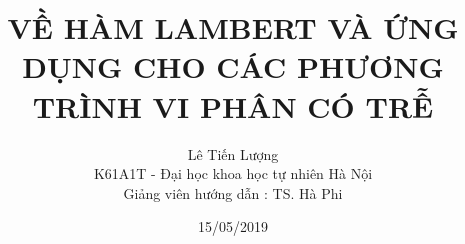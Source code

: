 \documentclass[12pt,a4paper]{book}
\begin{document}
\title{VỀ HÀM LAMBERT VÀ ỨNG DỤNG CHO CÁC PHƯƠNG TRÌNH VI PHÂN CÓ TRỄ}         
\author{Lê Tiến Lượng \\ K61A1T - Đại học khoa học tự nhiên Hà Nội \\ Giảng viên hướng dẫn : TS. Hà Phi}        
\date{15/05/2019}       
\maketitle
\tableofcontents %
	
	
	
	
\end{document}
